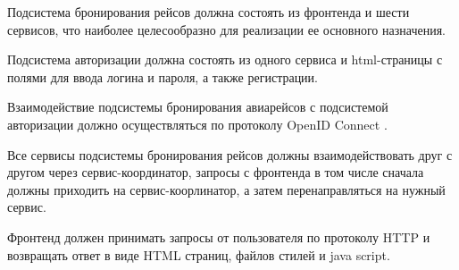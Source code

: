 Подсистема бронирования рейсов должна состоять из фронтенда и шести сервисов, что наиболее целесообразно для реализации ее основного назначения. 

Подсистема авторизации должна состоять из одного сервиса и html-страницы с полями для ввода логина и пароля, а также регистрации. 

Взаимодействие подсистемы бронирования авиарейсов с подсистемой авторизации должно осуществляться по протоколу OpenID Connect \cite{bib:openidconnect}.

Все сервисы подсистемы бронирования рейсов должны взаимодействовать друг с другом через сервис-координатор, запросы с фронтенда в том числе сначала должны приходить на сервис-коорлинатор, а затем перенаправляться на нужный сервис. 


Фронтенд должен принимать запросы от пользователя по протоколу HTTP и возвращать ответ в виде HTML страниц, файлов стилей и java script.

